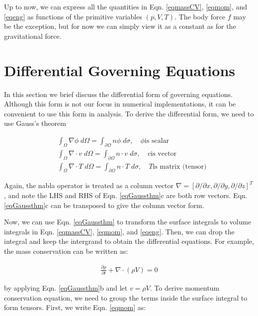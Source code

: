\documentclass[12pt, letterpaper]{report}
\begin{document}
Up to now, we can express all the quantities in Eqn. \ref{eqmassCV}, \ref{eqmom}, and \ref{eqeng}
as functions of the primitive variables $(p,V,T)$. The body force $f$ may be the exception, but for
now we can simply view it as a constant as for the gravitational force.
\paraspace

\clearpage
\section{Differential Governing Equations}

In this section we brief discuss the differential form of governing equations. Although this form is
not our focus in numerical implementations, it can be convenient to use this form in analysis. To
derive the differential form, we need to use Gauss's theorem

\begin{subequations}\label{eqGaussthm}
   \begin{align}
      &\int_\Omega \nabla \phi \; d\Omega = \int_{\partial\Omega} n\phi \; d\sigma, \quad \phi \textrm{
         is scalar} \\
      &\int_\Omega \nabla \cdot v \; d\Omega = \int_{\partial\Omega} n \cdot v \; d\sigma, \quad v \textrm{
         is vector} \\
      &\int_\Omega \nabla \cdot T \; d\Omega = \int_{\partial\Omega} n \cdot T \; d\sigma, \quad T \textrm{
         is matrix (tensor)}
   \end{align}
\end{subequations}

Again, the nabla operator is treated as a column vector $\nabla = [\partial/\partial x,
\partial/\partial y, \partial/\partial z]^T$, and note the LHS and RHS of Eqn. \ref{eqGaussthm}c
are both row vectors. Eqn. \ref{eqGaussthm}c can be transposed to give the column vector form.
\paraspace

Now, we can use Eqn. \ref{eqGaussthm} to transform the surface integrals to volume integrals in
Eqn. \ref{eqmassCV}, \ref{eqmom}, and \ref{eqeng}. Then, we can drop the integral and keep the
intergrand to obtain the differential equations. For example, the mass conservation can be written
as:

\begin{align}\label{eqmassDf}
   \frac{\partial \rho}{\partial t} + \nabla \cdot (\rho V) = 0
\end{align}

by applying Eqn. \ref{eqGaussthm}b and let $v = \rho V$. To derive momentum conservation equation,
we need to group the terms inside the surface integral to form tensors. First, we write Eqn.
\ref{eqmom} as:
\end{document}
